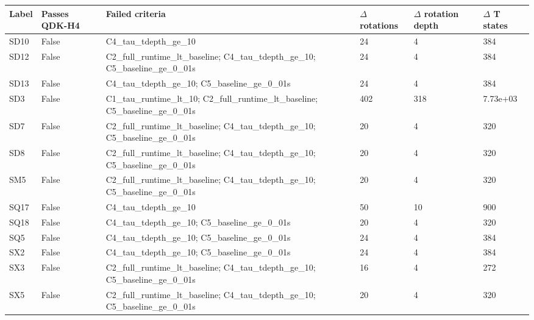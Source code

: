 \begin{tabular}{llllll}
\toprule
Label & Passes QDK-H4 & Failed criteria & $\Delta$ rotations & $\Delta$ rotation depth & $\Delta$ T states \\
\midrule
SD10 & False & C4\_tau\_tdepth\_ge\_10 & 24 & 4 & 384 \\
SD12 & False & C2\_full\_runtime\_lt\_baseline; C4\_tau\_tdepth\_ge\_10; C5\_baseline\_ge\_0\_01s & 24 & 4 & 384 \\
SD13 & False & C4\_tau\_tdepth\_ge\_10; C5\_baseline\_ge\_0\_01s & 24 & 4 & 384 \\
SD3 & False & C1\_tau\_runtime\_lt\_10; C2\_full\_runtime\_lt\_baseline; C5\_baseline\_ge\_0\_01s & 402 & 318 & 7.73e+03 \\
SD7 & False & C2\_full\_runtime\_lt\_baseline; C4\_tau\_tdepth\_ge\_10; C5\_baseline\_ge\_0\_01s & 20 & 4 & 320 \\
SD8 & False & C2\_full\_runtime\_lt\_baseline; C4\_tau\_tdepth\_ge\_10; C5\_baseline\_ge\_0\_01s & 20 & 4 & 320 \\
SM5 & False & C2\_full\_runtime\_lt\_baseline; C4\_tau\_tdepth\_ge\_10; C5\_baseline\_ge\_0\_01s & 20 & 4 & 320 \\
SQ17 & False & C4\_tau\_tdepth\_ge\_10 & 50 & 10 & 900 \\
SQ18 & False & C4\_tau\_tdepth\_ge\_10; C5\_baseline\_ge\_0\_01s & 20 & 4 & 320 \\
SQ5 & False & C4\_tau\_tdepth\_ge\_10; C5\_baseline\_ge\_0\_01s & 24 & 4 & 384 \\
SX2 & False & C4\_tau\_tdepth\_ge\_10; C5\_baseline\_ge\_0\_01s & 24 & 4 & 384 \\
SX3 & False & C2\_full\_runtime\_lt\_baseline; C4\_tau\_tdepth\_ge\_10; C5\_baseline\_ge\_0\_01s & 16 & 4 & 272 \\
SX5 & False & C2\_full\_runtime\_lt\_baseline; C4\_tau\_tdepth\_ge\_10; C5\_baseline\_ge\_0\_01s & 20 & 4 & 320 \\
\bottomrule
\end{tabular}
